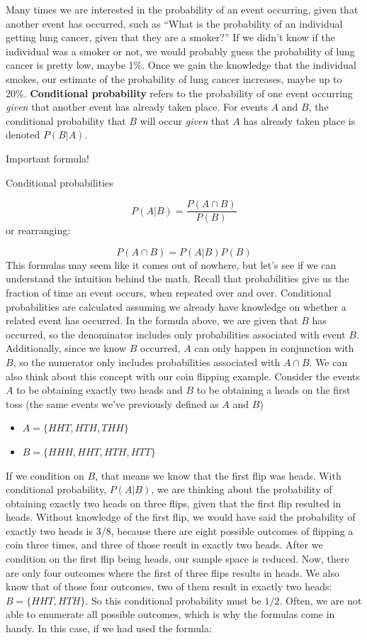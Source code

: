 \documentclass[
]{book}
\providecommand{\tightlist}{%
  \setlength{\itemsep}{0pt}\setlength{\parskip}{0pt}}
\theoremstyle{definition}
\theoremstyle{definition}
\theoremstyle{definition}
\theoremstyle{remark}
\begin{document}
Many times we are interested in the probability of an event occurring, given that another event has occurred, such as ``What is the probability of an individual getting lung cancer, given that they are a smoker?'' If we didn't know if the individual was a smoker or not, we would probably guess the probability of lung cancer is pretty low, maybe 1\%. Once we gain the knowledge that the individual smokes, our estimate of the probability of lung cancer increases, maybe up to 20\%. \textbf{Conditional probability} refers to the probability of one event occurring \emph{given} that another event has already taken place. For events \(A\) and \(B\), the conditional probability that \(B\) will occur \emph{given} that \(A\) has already taken place is denoted \(P(B|A)\).

Important formula!

Conditional probabilities

\[P(A|B) = \dfrac{P(A \cap B)}{P(B)}\]
or rearranging:

\[P(A \cap B) = P(A|B) P(B)\]
This formulas may seem like it comes out of nowhere, but let's see if we can understand the intuition behind the math. Recall that probabilities give us the fraction of time an event occurs, when repeated over and over. Conditional probabilities are calculated assuming we already have knowledge on whether a related event has occurred. In the formula above, we are given that \(B\) has occurred, so the denominator includes only probabilities associated with event \(B\). Additionally, since we know \(B\) occurred, \(A\) can only happen in conjunction with \(B\), so the numerator only includes probabilities associated with \(A \cap B\). We can also think about this concept with our coin flipping example. Consider the events \(A\) to be obtaining exactly two heads and \(B\) to be obtaining a heads on the first toss (the same events we've previously defined as \(A\) and \(B\))

\begin{itemize}
\tightlist
\item
  \(A = \{HHT, HTH, THH\}\)\\
\item
  \(B = \{HHH, HHT, HTH, HTT\}\)
\end{itemize}

If we condition on \(B\), that means we know that the first flip was heads. With conditional probability, \(P(A|B)\), we are thinking about the probability of obtaining exactly two heads on three flips, given that the first flip resulted in heads. Without knowledge of the first flip, we would have said the probability of exactly two heads is 3/8, because there are eight possible outcomes of flipping a coin three times, and three of those result in exactly two heads. After we condition on the first flip being heads, our sample space is reduced. Now, there are only four outcomes where the first of three flips results in heads. We also know that of those four outcomes, two of them result in exactly two heads: \(B = \{HHT, HTH\}\). So this conditional probability must be \(1/2\). Often, we are not able to enumerate all possible outcomes, which is why the formulas come in handy. In this case, if we had used the formula:
\end{document}
